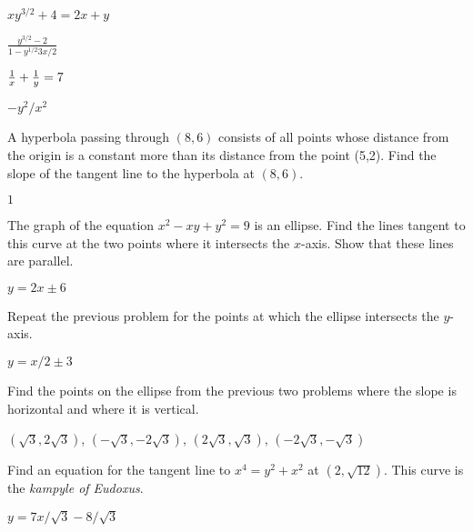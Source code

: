 \begin{exercises}
\begin{exercise} $xy^{3/2}+4 = 2x+y$
\begin{answer} $\frac{y^{3/2}-2}{1-y^{1/2}3x/2}$
\end{answer}\end{exercise}

\begin{exercise} ${1\over x} + {1\over y} = 7$
\begin{answer} $-y^2/x^2$
\end{answer}\end{exercise}

\endtwocol

\begin{exercise}
A hyperbola passing through $(8,6)$ consists of all points whose distance
from the origin is a constant more than its distance from the point (5,2).
Find the slope of the tangent line to the hyperbola at $(8,6)$.
\begin{answer} $1$
\end{answer}\end{exercise}

\begin{exercise} The graph of the equation $x^2 - xy + y^2 = 9$ is an ellipse.
Find the lines tangent to this curve at the two
 points where it intersects the $x$-axis. Show that these lines are
 parallel.
\begin{answer} $y=2x\pm6$
\end{answer}\end{exercise}

\begin{exercise} Repeat the previous problem for the points at which the
 ellipse intersects the $y$-axis.
\begin{answer} $y=x/2\pm3$
\end{answer}\end{exercise}

\begin{exercise} Find the points on the ellipse from the previous two problems
 where the slope is horizontal and where it is vertical.
\begin{answer} $(\sqrt3,2\sqrt3)$, $(-\sqrt3,-2\sqrt3)$, $(2\sqrt3,\sqrt3)$,
$(-2\sqrt3,-\sqrt3)$ 
\end{answer}\end{exercise}

\begin{exercise} Find an equation for the tangent line to 
$x^4 = y^2 + x^2$ at $(2, \sqrt{12})$. 
This curve is the \textit{kampyle of Eudoxus}.
\begin{answer} $y=7x/\sqrt3-8/\sqrt3$
\end{answer}\end{exercise}


\end{exercises}
